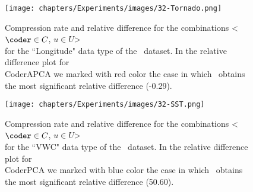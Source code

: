 

\newcommand{\commonfigurescomp}{Compression rate and relative difference for the combinations <$\coder \in C$, $u \in U$>\\for the }

\begin{figure}
\hspace{-70pt}
\texttt{[image: chapters/Experiments/images/32-Tornado.png]}
\hspace{+10pt}
\caption{\commonfigurescomp ``Longitude" data type of the \datasettornado \ dataset. In the relative difference plot for\\CoderAPCA we marked with red color the case in which \cNOmaskalgo \ obtains \\the most significant relative difference (-0.29).}
\label{fig:diff-tornado}
\end{figure}

\clearpage

\begin{figure}
\hspace{-70pt}
\texttt{[image: chapters/Experiments/images/32-SST.png]}
\hspace{+10pt}
\caption{\commonfigurescomp ``VWC" data type of the \datasetsst \ dataset. In the relative difference plot for\\CoderPCA we marked with blue color the case in which \cmaskalgo \ obtains \\the most significant relative difference (50.60).}
\label{fig:diff-sst}
\end{figure}

